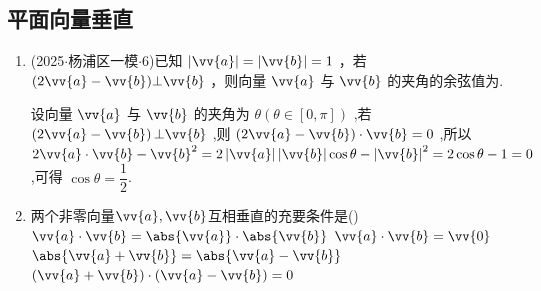 \subsection*{平面向量垂直}
\begin{enumerate}
    \item (2025$\cdot$杨浦区一模$\cdot$6)已知 $\left| \vv{a}\right|  = \left| \vv{b}\right|  = 1$ ，若$(2\vv{a} - \vv{b})\bot \vv{b}$ ，则向量 $\vv{a}$ 与 $\vv{b}$ 的夹角的余弦值为.
    \begin{jieda}
        设向量 $\vv{a}$ 与 $\vv{b}$ 的夹角为 $\theta \left( {\theta  \in  \left\lbrack  {0,\pi }\right\rbrack  }\right)$ ,若 $\left( {2\vv{a} - \vv{b}}\right)  \bot  \vv{b}$ ,则 $\left( {2\vv{a} - \vv{b}}\right)  \cdot  \vv{b} = 0$ ,所以 $2\vv{a} \cdot  \vv{b} - {\vv{b}}^{2} = 2\left| \vv{a}\right| \left| \vv{b}\right| \cos \theta  - {\left| \vv{b}\right| }^{2}  = 2\cos \theta  - 1 = 0$ ,可得 $\cos \theta  = \dfrac{1}{2}$.
    \end{jieda}
    \item 两个非零向量$\vv{a},\vv{b}$互相垂直的充要条件是\dotfill()
    \xx
    {$\vv{a}\cdot\vv{b}=\abs{\vv{a}}\cdot\abs{\vv{b}}$}
    {$\vv{a}\cdot\vv{b}=\vv{0}$}
    {$\abs{\vv{a}+\vv{b}}=\abs{\vv{a}-\vv{b}}$}
    {$(\vv{a}+\vv{b})\cdot(\vv{a}-\vv{b})=0$}
\end{enumerate}
